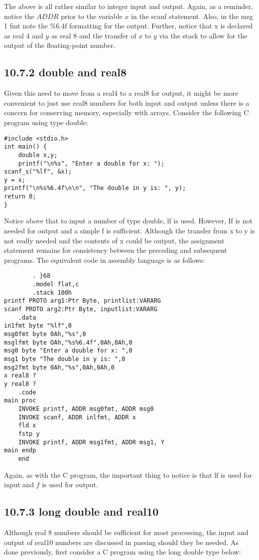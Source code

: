 \documentclass[10pt]{article}
\begin{document}
The above is all rather similar to integer input and output. Again, as a reminder, notice the $A D D R$ prior to the variable $x$ in the scanf statement. Also, in the msg 1 fmt note the $\% 6.4 \mathrm{f}$ formatting for the output. Further, notice that x is declared as real 4 and $y$ as real 8 and the transfer of $x$ to $y$ via the stack to allow for the output of the floating-point number.

\subsection*{10.7.2 double and real8}
Given this need to move from a real4 to a real8 for output, it might be more convenient to just use real8 numbers for both input and output unless there is a concern for conserving memory, especially with arrays. Consider the following C program using type double:

\begin{verbatim}
#include <stdio.h>
int main() {
    double x,y;
    printf("\n%s", "Enter a double for x: ");
scanf_s("%lf", &x);
y = x;
printf("\n%s%6.4f\n\n", "The double in y is: ", y);
return 0;
}
\end{verbatim}

Notice above that to input a number of type double, lf is used. However, If is not needed for output and a simple f is sufficient. Although the transfer from x to y is not really needed and the contents of x could be output, the assignment statement remains for consistency between the preceding and subsequent programs. The equivalent code in assembly language is as follows:

\begin{verbatim}
        . }68
        .model flat,c
        .stack 100h
printf PROTO arg1:Ptr Byte, printlist:VARARG
scanf PROTO arg2:Ptr Byte, inputlist:VARARG
    .data
in1fmt byte "%lf",0
msg0fmt byte 0Ah,"%s",0
msglfmt byte OAh,"%s%6.4f",0Ah,0Ah,0
msg0 byte "Enter a double for x: ",0
msg1 byte "The double in y is: ",0
msg2fmt byte 0Ah,"%s",0Ah,0Ah,0
x real8 ?
y real8 ?
    .code
main proc
    INVOKE printf, ADDR msg0fmt, ADDR msg0
    INVOKE scanf, ADDR inlfmt, ADDR x
    fld x
    fstp y
    INVOKE printf, ADDR msg1fmt, ADDR msg1, Y
main endp
    end
\end{verbatim}

Again, as with the C program, the important thing to notice is that lf is used for input and $f$ is used for output.

\subsection*{10.7.3 long double and real10}
Although real 8 numbers should be sufficient for most processing, the input and output of real10 numbers are discussed in passing should they be needed. As done previously, first consider a C program using the long double type below:
\end{document}
